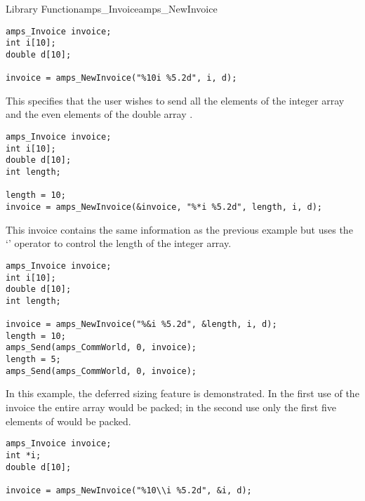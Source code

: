 \begin{deftypefn}{Library Function}{amps_Invoice}{amps\_NewInvoice}
{\EXAMPLE
\begin{display}\begin{verbatim}
amps_Invoice invoice;
int i[10];
double d[10];

invoice = amps_NewInvoice("%10i %5.2d", i, d);
\end{verbatim}\end{display}

This specifies that the user wishes to send all the elements of the
integer array  and the even elements of the double array .

\EXAMPLE
\begin{display}\begin{verbatim}
amps_Invoice invoice;
int i[10];
double d[10];
int length;

length = 10;
invoice = amps_NewInvoice(&invoice, "%*i %5.2d", length, i, d);
\end{verbatim}\end{display}

This invoice contains the same information as the previous example but uses
the `\code{*}' operator to control the length of the integer array.

\EXAMPLE
\begin{display}\begin{verbatim}
amps_Invoice invoice;
int i[10];
double d[10];
int length;

invoice = amps_NewInvoice("%&i %5.2d", &length, i, d);
length = 10;
amps_Send(amps_CommWorld, 0, invoice);
length = 5;
amps_Send(amps_CommWorld, 0, invoice);
\end{verbatim}\end{display}
In this example, the deferred sizing feature is demonstrated.  In the
first use of the invoice the entire array  would be packed; in
the second use only the first five elements of  would be
packed.
\EXAMPLE
\begin{display}\begin{verbatim}
amps_Invoice invoice;
int *i;
double d[10];

invoice = amps_NewInvoice("%10\\i %5.2d", &i, d);

\end{verbatim}\end{display}



}
\end{deftypefn}
